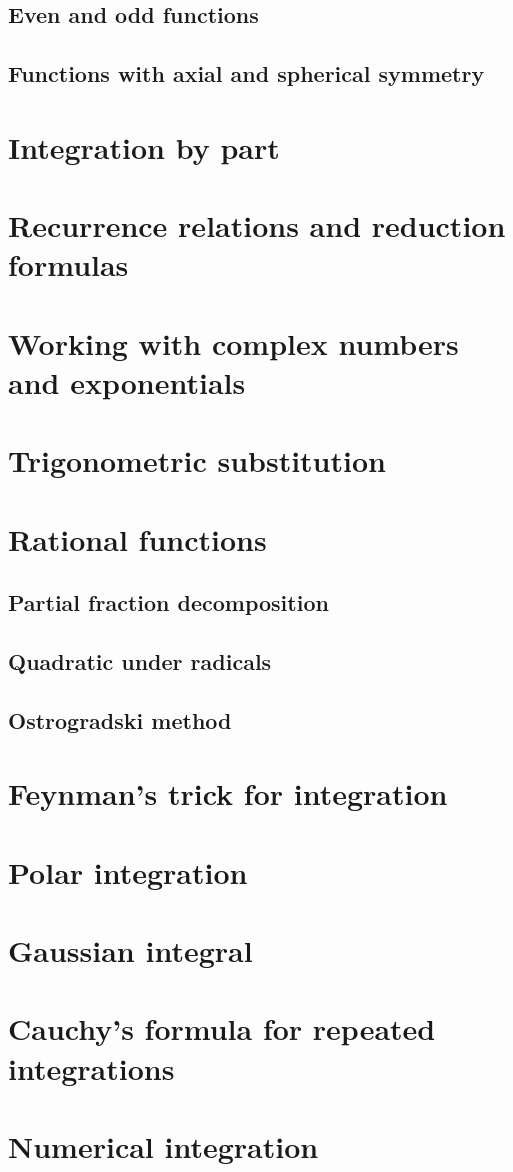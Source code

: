 \subsection{Even and odd functions}

\subsection{Functions with axial and spherical symmetry}

\section{Integration by part}

\section{Recurrence relations and reduction formulas}

\section{Working with complex numbers and exponentials}

\section{Trigonometric substitution}

\section{Rational functions}

\subsection{Partial fraction decomposition}

\subsection{Quadratic under radicals}

\subsection{Ostrogradski method}

\section{Feynman's trick for integration}

\section{Polar integration}

\section{Gaussian integral}

\section{Cauchy's formula for repeated integrations}

\section{Numerical integration}